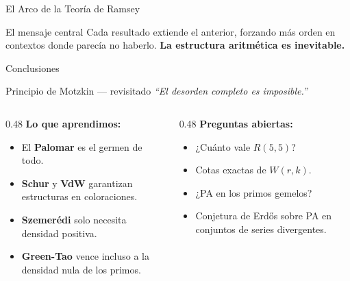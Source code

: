 \begin{frame}{El Arco de la Teoría de Ramsey}
    \vspace{0.2cm}

    \begin{block}{El mensaje central}
        Cada resultado extiende el anterior, forzando más orden
        en contextos donde parecía no haberlo.
        \textbf{La estructura aritmética es inevitable.}
    \end{block}

\end{frame}


\begin{frame}{Conclusiones}

    \begin{exampleblock}{\centering Principio de Motzkin — revisitado}
        \centering
        \large\textit{``El desorden completo es imposible.''}
    \end{exampleblock}

    \vspace{0.2cm}

    \begin{columns}[T]
        \begin{column}{0.48\textwidth}
            \textbf{Lo que aprendimos:}
            \begin{itemize}
                \item El \textbf{Palomar} es el germen de todo.
                \item \textbf{Schur} y \textbf{VdW} garantizan
                      estructuras en coloraciones.
                \item \textbf{Szemerédi} solo necesita densidad positiva.
                \item \textbf{Green-Tao} vence incluso a la
                      densidad nula de los primos.
            \end{itemize}
        \end{column}
        \begin{column}{0.48\textwidth}
            \textbf{Preguntas abiertas:}
            \begin{itemize}
                \item ¿Cuánto vale $R(5,5)$?
                \item Cotas exactas de $W(r,k)$.
                \item ¿PA en los primos gemelos?
                \item Conjetura de Erdős sobre PA en
                      conjuntos de series divergentes.
            \end{itemize}
        \end{column}
    \end{columns}

\end{frame}


